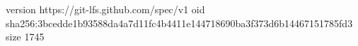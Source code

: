 version https://git-lfs.github.com/spec/v1
oid sha256:3bcedde1b93588da4a7d11fc4b4411e144718690ba3f373d6b14467151785fd3
size 1745
